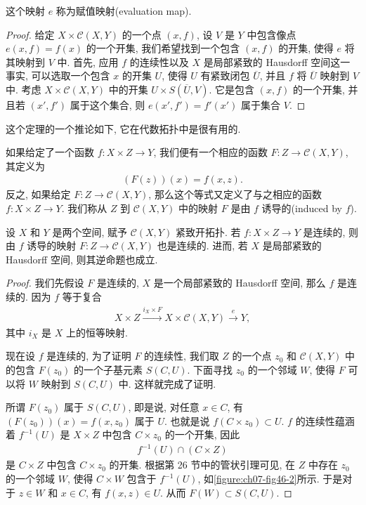 \documentclass[../../main.tex]{subfiles}
\begin{document}
这个映射 $e$ 称为赋值映射(evaluation map).

\begin{proof}
给定 $X\times\mathcal{C}(X,Y)$ 的一个点 $(x,f)$, 设 $V$ 是 $Y$ 中包含像点 $e(x,f)=f(x)$ 的一个开集, 我们希望找到一个包含 $(x,f)$ 的开集, 使得 $e$ 将其映射到 $V$ 中. 首先, 应用 $f$ 的连续性以及 $X$ 是局部紧致的 Hausdorff 空间这一事实, 可以选取一个包含 $x$ 的开集 $U$, 使得 $U$ 有紧致闭包 $\overline{U}$, 并且 $f$ 将 $\overline{U}$ 映射到 $V$ 中. 考虑 $X\times\mathcal{C}(X,Y)$ 中的开集 $U\times S(\overline{U},V)$. 它是包含 $(x,f)$ 的一个开集, 并且若 $(x',f')$ 属于这个集合, 则 $e(x',f')=f'(x')$ 属于集合 $V$.
\end{proof}

这个定理的一个推论如下, 它在代数拓扑中是很有用的.

\begin{definition}\label{definition:ch07-induced-map}
如果给定了一个函数 $f\colon X\times Z\to Y$, 我们便有一个相应的函数 $F\colon Z\to\mathcal{C}(X,Y)$, 其定义为
\begin{align*}
(F(z))(x)=f(x,z).
\end{align*}
反之, 如果给定 $F\colon Z\to\mathcal{C}(X,Y)$, 那么这个等式又定义了与之相应的函数 $f\colon X\times Z\to Y$. 我们称从 $Z$ 到 $\mathcal{C}(X,Y)$ 中的映射 $F$ 是由 $f$ 诱导的(induced by $f$).
\end{definition}

\begin{theorem}\label{theorem:ch07-induced-map}
设 $X$ 和 $Y$ 是两个空间, 赋予 $\mathcal{C}(X,Y)$ 紧致开拓扑. 若 $f\colon X\times Z\to Y$ 是连续的, 则由 $f$ 诱导的映射 $F\colon Z\to\mathcal{C}(X,Y)$ 也是连续的. 进而, 若 $X$ 是局部紧致的 Hausdorff 空间, 则其逆命题也成立.
\end{theorem}

\begin{proof}
我们先假设 $F$ 是连续的, $X$ 是一个局部紧致的 Hausdorff 空间, 那么 $f$ 是连续的. 因为 $f$ 等于复合
\begin{align*}
X\times Z\xrightarrow{i_X\times F}X\times\mathcal{C}(X,Y)\xrightarrow{e}Y,
\end{align*}
其中 $i_X$ 是 $X$ 上的恒等映射.

现在设 $f$ 是连续的, 为了证明 $F$ 的连续性, 我们取 $Z$ 的一个点 $z_0$ 和 $\mathcal{C}(X,Y)$ 中的包含 $F(z_0)$ 的一个子基元素 $S(C,U)$. 下面寻找 $z_0$ 的一个邻域 $W$, 使得 $F$ 可以将 $W$ 映射到 $S(C,U)$ 中. 这样就完成了证明.

所谓 $F(z_0)$ 属于 $S(C,U)$, 即是说, 对任意 $x\in C$, 有 $(F(z_0))(x)=f(x,z_0)$ 属于 $U$. 也就是说 $f(C\times z_0)\subset U$. $f$ 的连续性蕴涵着 $f^{-1}(U)$ 是 $X\times Z$ 中包含 $C\times z_0$ 的一个开集, 因此
\begin{align*}
f^{-1}(U)\cap(C\times Z)
\end{align*}
是 $C\times Z$ 中包含 $C\times z_0$ 的开集. 根据第 26 节中的管状引理可见, 在 $Z$ 中存在 $z_0$ 的一个邻域 $W$, 使得 $C\times W$ 包含于 $f^{-1}(U)$, 如\cref{figure:ch07-fig46-2}所示. 于是对于 $z\in W$ 和 $x\in C$, 有 $f(x,z)\in U$. 从而 $F(W)\subset S(C,U)$.
\end{proof}
\end{document}
